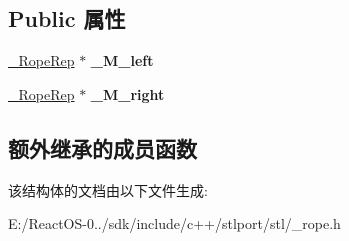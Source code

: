 \subsection*{Public 属性}
\begin{DoxyCompactItemize}
\item 
\mbox{\label{struct___rope___rope_concatenation_aedb3b50633135125c785616d7b6c06c4}} 
\hyperlink{struct___rope___rope_rep}{\+\_\+\+Rope\+Rep} $\ast$ {\bfseries \+\_\+\+M\+\_\+left}
\item 
\mbox{\label{struct___rope___rope_concatenation_a8b1871b08b0b3d0b50e7f35b44a9095d}} 
\hyperlink{struct___rope___rope_rep}{\+\_\+\+Rope\+Rep} $\ast$ {\bfseries \+\_\+\+M\+\_\+right}
\end{DoxyCompactItemize}
\subsection*{额外继承的成员函数}


该结构体的文档由以下文件生成\+:\begin{DoxyCompactItemize}
\item 
E\+:/\+React\+O\+S-\/0../sdk/include/c++/stlport/stl/\+\_\+rope.\+h\end{DoxyCompactItemize}
